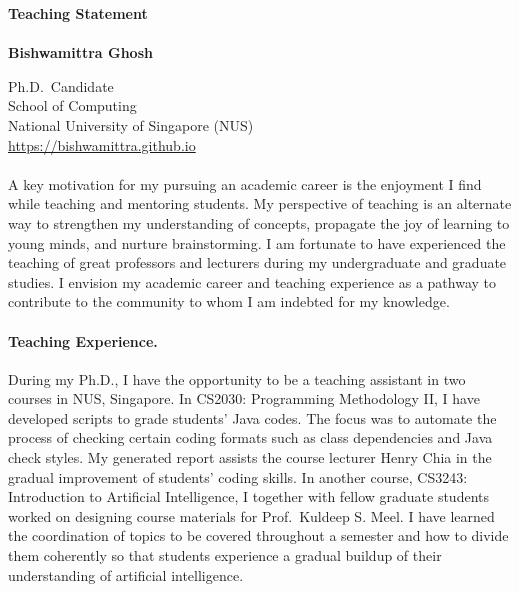 \documentclass[11pt]{article}
\newcommand{\blue}[1]{\textcolor{blue}{#1}}
\begin{document}
	\noindent\huge \textbf{Teaching Statement} \\
	\vspace{0.1em}\\
	\Large \textbf{Bishwamittra Ghosh}
		
	\normalsize
	\noindent Ph.D.\ Candidate\\
	School of Computing\\
	National University of Singapore (NUS)\\
	\blue{\url{https://bishwamittra.github.io}}



	\paragraph{}
		A key motivation for my pursuing an academic career is the enjoyment I find while teaching and mentoring students. My perspective of teaching is an alternate way to strengthen my understanding of concepts, propagate the joy of learning to young minds, and nurture brainstorming. I am fortunate to have experienced the teaching of great professors and lecturers during my undergraduate and graduate studies. I envision my academic career and teaching experience as a pathway to contribute to the community to whom I am indebted for my knowledge.
		
	
	\paragraph{Teaching Experience.}
		During my Ph.D., I have the opportunity to be a teaching assistant in two courses in NUS, Singapore. In CS2030: Programming Methodology II, I have developed scripts to grade students' Java codes. The focus was to automate the process of checking certain coding formats such as class dependencies and Java check styles. My generated report assists the course lecturer Henry Chia in the gradual improvement of students' coding skills. In another course, CS3243: Introduction to Artificial Intelligence, I together with fellow graduate students worked on designing course materials for Prof.\ Kuldeep S. Meel. I have learned the coordination of topics to be covered throughout a semester and how to divide them coherently so that students experience a gradual buildup of their understanding of artificial intelligence.
		
\end{document}

